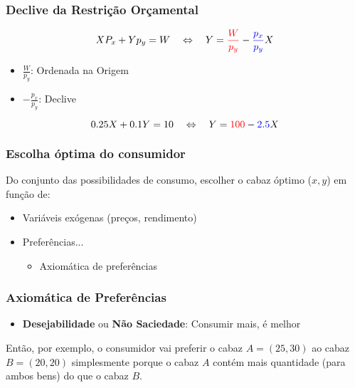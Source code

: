 \begin{frame}
	\frametitle{Declive da Restri\c c\~ao Or\c camental}
	\begin{align*}
		X P_x + Y p_y = W \quad \Leftrightarrow \quad Y = {\color{red}\frac{W}{p_y}} - {\color{blue}\frac{p_x}{p_y}}X
	\end{align*}

	\begin{itemize}
		\item $\frac{W}{p_y}$: {\color{red}Ordenada na Origem}
		\item $-\frac{p_x}{p_y}$: {\color{blue}Declive}
	\end{itemize}

	$$0.25X + 0.1Y = 10 \quad \Leftrightarrow \quad Y = {\color{red}100} - {\color{blue}2.5} X$$
\end{frame}


\begin{frame}
	\frametitle{Escolha \'optima do consumidor}
	Do conjunto das possibilidades de consumo, escolher o cabaz \'optimo ($x,y$) em fun\c c\~ao de:\pause
	\vspace{0.2cm}
	\begin{itemize}
		\item Vari\'aveis ex\'ogenas (pre\c cos, rendimento)
		\item Prefer\^encias...
			\begin{itemize}
				\item Axiom\'atica de prefer\^encias
			\end{itemize}
	\end{itemize}
\end{frame}

\begin{frame}
	\frametitle{Axiom\'atica de Prefer\^encias}
	\begin{itemize}
		\item \textbf{Desejabilidade} ou \textbf{N\~ao Saciedade}: Consumir mais, \'e melhor
	\end{itemize}

	Ent\~ao, por exemplo, o consumidor vai preferir o cabaz $A=(25,30)$ ao cabaz $B=(20,20)$ simplesmente porque o cabaz $A$ cont\'em mais quantidade (para ambos bens) do que o cabaz $B$.

\end{frame}

